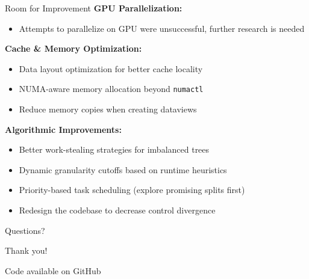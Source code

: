\documentclass{beamer}
\begin{document}
\begin{frame}{Room for Improvement}
\textbf{GPU Parallelization:}
\begin{itemize}
    \item Attempts to parallelize on GPU were unsuccessful, further research is needed
\end{itemize}

\vspace{0.5em}
\textbf{Cache \& Memory Optimization:}
\begin{itemize}
    \item Data layout optimization for better cache locality
    \item NUMA-aware memory allocation beyond \texttt{numactl}
    \item Reduce memory copies when creating dataviews
\end{itemize}

\vspace{0.5em}
\textbf{Algorithmic Improvements:}
\begin{itemize}
    \item Better work-stealing strategies for imbalanced trees
    \item Dynamic granularity cutoffs based on runtime heuristics
    \item Priority-based task scheduling (explore promising splits first)
    \item Redesign the codebase to decrease control divergence
\end{itemize}
\end{frame}

\begin{frame}{Questions?}
\begin{center}
\Huge Thank you!

\vspace{1em}
\large Code available on GitHub
\end{center}
\end{frame}
\end{document}
